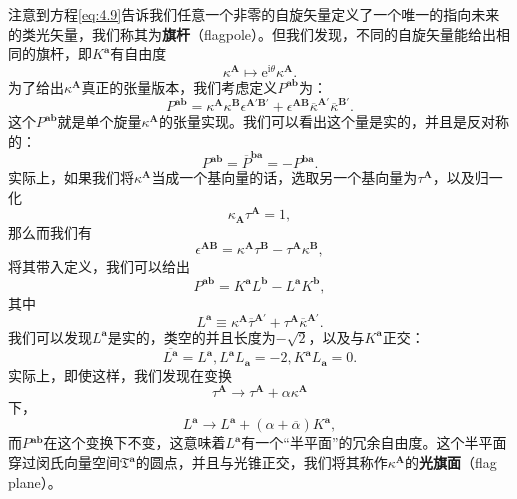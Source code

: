 注意到方程\ref{eq:4.9}告诉我们任意一个非零的自旋矢量定义了一个唯一的指向未来的类光矢量，我们称其为\textbf{旗杆}（flagpole）。但我们发现，不同的自旋矢量能给出相同的旗杆，即$K^{\boldsymbol{a}}$有自由度
\begin{equation}
	\kappa ^{\boldsymbol{A}} \mapsto \mathrm{e}^{\mathrm{i} \theta } \kappa ^{\boldsymbol{A}} .
	\label{eq:4.12}
\end{equation}
为了给出$\kappa ^{\boldsymbol{A}}$真正的张量版本，我们考虑定义$P^{\boldsymbol{ab}}$为：
\begin{equation}
	P^{\boldsymbol{ab}} =\kappa ^{\boldsymbol{A}} \kappa ^{\boldsymbol{B}} \epsilon ^{\boldsymbol{A} '\boldsymbol{B} '} +\epsilon ^{\boldsymbol{AB}}\overline{\kappa }^{\boldsymbol{A} '}\overline{\kappa }^{\boldsymbol{B} '} .
	\label{eq:4.13}
\end{equation}
这个$P^{\boldsymbol{ab}}$就是单个旋量$\kappa ^{\boldsymbol{A}}$的张量实现。我们可以看出这个量是实的，并且是反对称的：
\begin{equation*}
	P^{\boldsymbol{ab}} =\overline{P}^{\boldsymbol{ba}} =-P^{\boldsymbol{ba}} .
\end{equation*}
实际上，如果我们将$\kappa ^{\boldsymbol{A}}$当成一个基向量的话，选取另一个基向量为$\tau ^{\boldsymbol{A}}$，以及归一化
\begin{equation*}
	\kappa _{\boldsymbol{A}} \tau ^{\boldsymbol{A}} =1,
\end{equation*}
那么而我们有
\begin{equation*}
	\epsilon ^{\boldsymbol{AB}} =\kappa ^{\boldsymbol{A}} \tau ^{\boldsymbol{B}} -\tau ^{\boldsymbol{A}} \kappa ^{\boldsymbol{B}} ,
\end{equation*}
将其带入定义，我们可以给出
\begin{equation*}
	P^{\boldsymbol{ab}} =K^{\boldsymbol{a}} L^{\boldsymbol{b}} -L^{\boldsymbol{a}} K^{\boldsymbol{b}} ,
\end{equation*}
其中
\begin{equation*}
	L^{\boldsymbol{a}} \equiv \kappa ^{\boldsymbol{A}}\overline{\tau }^{\boldsymbol{A} '} +\tau ^{\boldsymbol{A}}\overline{\kappa }^{\boldsymbol{A} '} .
\end{equation*}
我们可以发现$L^{\boldsymbol{a}}$是实的，类空的并且长度为$-\sqrt{2}$，以及与$K^{\boldsymbol{a}}$正交：
\begin{equation*}
	\overline{L^{\boldsymbol{a}}} =L^{\boldsymbol{a}} ,L^{\boldsymbol{a}} L_{\boldsymbol{a}} =-2,K^{\boldsymbol{a}} L_{\boldsymbol{a}} =0.
\end{equation*}
实际上，即使这样，我们发现在变换
\begin{equation*}
	\tau ^{\boldsymbol{A}}\rightarrow \tau ^{\boldsymbol{A}} +\alpha \kappa ^{\boldsymbol{A}}
\end{equation*}
下，
\begin{equation*}
	L^{\boldsymbol{a}}\rightarrow L^{\boldsymbol{a}} +( \alpha +\overline{\alpha }) K^{\boldsymbol{a}} ,
\end{equation*}
而$P\boldsymbol{^{ab}}$在这个变换下不变，这意味着$L^{\boldsymbol{a}}$有一个“半平面”的冗余自由度。这个半平面穿过闵氏向量空间$\mathfrak{T}^{\boldsymbol{a}}$的圆点，并且与光锥正交，我们将其称作$\kappa ^{\boldsymbol{A}}$的\textbf{光旗面}（flag plane）。



